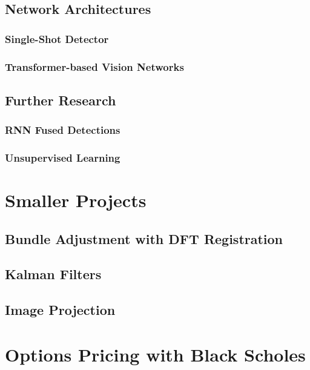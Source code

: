 \documentclass[12pt]{article}
\begin{document}
\subsection{Network Architectures}
\subsubsection{Single-Shot Detector}

\subsubsection{Transformer-based Vision Networks}

\subsection{Further Research}
\subsubsection{RNN Fused Detections}

\subsubsection{Unsupervised Learning}

\section{Smaller Projects}
\subsection{Bundle Adjustment with DFT Registration}

\subsection{Kalman Filters}

\subsection{Image Projection}

\section{Options Pricing with Black Scholes}
\end{document}
